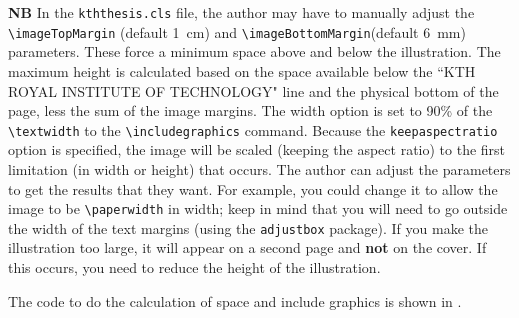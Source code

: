 \documentclass[12pt, twoside]{article}
\begin{document}
\textbf{NB} In the \texttt{kththesis.cls} file, the author may have to manually adjust the  \texttt{\textbackslash imageTopMargin} (default \qty{1}{cm}) and \texttt{\textbackslash imageBottomMargin}(default \qty{6}{mm}) parameters. These force a minimum space above and below the illustration.  The maximum height is calculated based on the space available below the ``KTH ROYAL INSTITUTE OF TECHNOLOGY" line and the physical bottom of the page, less the sum of the image margins. The width option is set to 90\% of the \texttt{\textbackslash textwidth} to the \texttt{\textbackslash includegraphics} command. Because the \texttt{keepaspectratio} option is specified, the image will be scaled (keeping the aspect ratio) to the first limitation (in width or height) that occurs. The author can adjust the parameters to get the results that they want. For example, you could change it to allow the image to be \texttt{\textbackslash paperwidth} in width; keep in mind that you will need to go outside the width of the text margins (using the \texttt{adjustbox} package). If you make the illustration too large, it will appear on a second page and \textbf{not} on the cover. If this occurs, you need to reduce the height of the illustration.

The code to do the calculation of space and include graphics is shown in .
\end{document}
